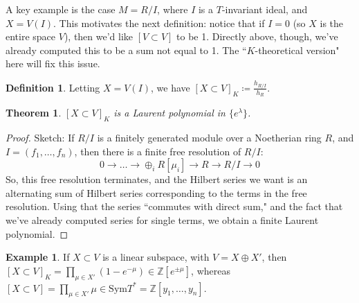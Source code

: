 \documentclass[12pt]{amsart}
\numberwithin{equation}{section}
\newtheorem{Theorem}[equation]{Theorem}
\theoremstyle{definition}
\newtheorem{Example}[equation]{Example}
\newtheorem{Definition}[equation]{Definition}
\numberwithin{figure}{section}
\newcommand{\Z}{\mathbb{Z}}
\begin{document}
A key example is the case $M = R/I$,  where $I$ is a $T$-invariant ideal, and $X = V(I)$. This motivates the next definition: notice that if $I=0$ (so $X$ is the entire space $V$), then we'd like $[V \subset V]$ to be 1. Directly above, though, we've already computed this to be a sum not equal to 1. The ``$K$-theoretical version" here will fix this issue.

\begin{Definition}
Letting $X = V(I)$, we have $[X \subset V]_K \coloneqq \frac{h_{R/I}}{h_R}$.
\end{Definition}

\begin{Theorem}
$[X \subset V]_K$ is a Laurent polynomial in $\{e^{\lambda}\}$.
\end{Theorem}
\begin{proof}
Sketch: If $R/I$ is a finitely generated module over a Noetherian ring $R$, and $I = (f_1, \dots, f_n)$, then there is a finite free resolution of $R/I$:
$$ 0 \to \dots \to \oplus_i R[\mu_i] \to R \to R/I \to 0 $$
So, this free resolution terminates, and the Hilbert series we want is an alternating sum of Hilbert series corresponding to the terms in the free resolution. Using that the series ``commutes with direct sum," and the fact that we've already computed series for single terms, we obtain a finite Laurent polynomial.
\end{proof}

\begin{Example}
If $X \subset V$ is a linear subspace, with $V = X \oplus X'$, then $[X \subset V]_K = \prod_{\mu \in X'}(1-e^{-\mu}) \in \Z[e^{\pm \mu}]$, whereas $[X \subset V] = \prod_{\mu \in X'} \mu \in \text{Sym}T^{\ast} = \Z[y_1, \dots, y_n]$.
\end{Example}
\end{document}
